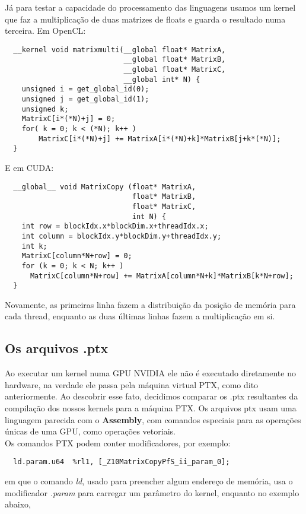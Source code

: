 Já para testar a capacidade do processamento das linguagens usamos um kernel que faz a multiplicação de duas matrizes de floats e guarda
o resultado numa terceira.
Em OpenCL:
\begin{lstlisting}
  __kernel void matrixmulti(__global float* MatrixA, 
                            __global float* MatrixB, 
                            __global float* MatrixC, 
                            __global int* N) {
    unsigned i = get_global_id(0);
    unsigned j = get_global_id(1);
    unsigned k;
    MatrixC[i*(*N)+j] = 0;
    for( k = 0; k < (*N); k++ ) 
    	MatrixC[i*(*N)+j] += MatrixA[i*(*N)+k]*MatrixB[j+k*(*N)];
  }
\end{lstlisting}
E em CUDA:
\begin{lstlisting}
  __global__ void MatrixCopy (float* MatrixA, 
                              float* MatrixB, 
                              float* MatrixC, 
                              int N) {
    int row = blockIdx.x*blockDim.x+threadIdx.x;
    int column = blockIdx.y*blockDim.y+threadIdx.y;
    int k;
    MatrixC[column*N+row] = 0;
    for (k = 0; k < N; k++ )
      MatrixC[column*N+row] += MatrixA[column*N+k]*MatrixB[k*N+row];
  }
\end{lstlisting}

Novamente, as primeiras linha fazem a distribuição da posição de memória para cada thread, enquanto as duas últimas linhas fazem a multiplicação em si.

\subsection{Os arquivos .ptx}

Ao executar um kernel numa GPU NVIDIA ele não é executado diretamente no hardware, na verdade ele passa pela máquina virtual PTX, como dito anteriormente.
Ao descobrir esse fato, decidimos comparar os .ptx resultantes da compilação dos nossos kernels para a máquina PTX.
Os arquivos ptx usam uma linguagem parecida com o \textbf{Assembly}, com comandos especiais para as operações únicas de uma GPU, como operações vetoriais. \\

Os comandos PTX podem conter modificadores, por exemplo:

\begin{lstlisting}
  ld.param.u64 	%rl1, [_Z10MatrixCopyPfS_ii_param_0];
\end{lstlisting}

em que o comando \textit{ld}, usado para preencher algum endereço de memória, usa o modificador \textit{.param} para carregar um parâmetro do kernel,
enquanto no exemplo abaixo,

